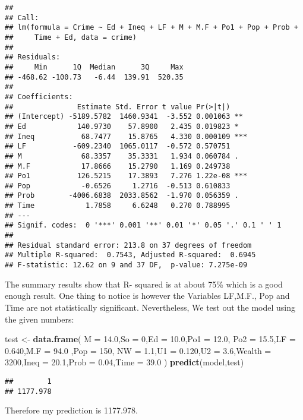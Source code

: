 \documentclass[
]{article}
\newenvironment{Shaded}{\begin{snugshade}}{\end{snugshade}}
\newcommand{\DataTypeTok}[1]{\textcolor[rgb]{0.13,0.29,0.53}{#1}}
\newcommand{\DecValTok}[1]{\textcolor[rgb]{0.00,0.00,0.81}{#1}}
\newcommand{\FloatTok}[1]{\textcolor[rgb]{0.00,0.00,0.81}{#1}}
\newcommand{\KeywordTok}[1]{\textcolor[rgb]{0.13,0.29,0.53}{\textbf{#1}}}
\newcommand{\NormalTok}[1]{#1}
\newcommand{\StringTok}[1]{\textcolor[rgb]{0.31,0.60,0.02}{#1}}
\begin{document}
\begin{verbatim}
## 
## Call:
## lm(formula = Crime ~ Ed + Ineq + LF + M + M.F + Po1 + Pop + Prob + 
##     Time + Ed, data = crime)
## 
## Residuals:
##     Min      1Q  Median      3Q     Max 
## -468.62 -100.73   -6.44  139.91  520.35 
## 
## Coefficients:
##               Estimate Std. Error t value Pr(>|t|)    
## (Intercept) -5189.5782  1460.9341  -3.552 0.001063 ** 
## Ed            140.9730    57.8900   2.435 0.019823 *  
## Ineq           68.7477    15.8765   4.330 0.000109 ***
## LF           -609.2340  1065.0117  -0.572 0.570751    
## M              68.3357    35.3331   1.934 0.060784 .  
## M.F            17.8666    15.2790   1.169 0.249738    
## Po1           126.5215    17.3893   7.276 1.22e-08 ***
## Pop            -0.6526     1.2716  -0.513 0.610833    
## Prob        -4006.6838  2033.8562  -1.970 0.056359 .  
## Time            1.7858     6.6248   0.270 0.788995    
## ---
## Signif. codes:  0 '***' 0.001 '**' 0.01 '*' 0.05 '.' 0.1 ' ' 1
## 
## Residual standard error: 213.8 on 37 degrees of freedom
## Multiple R-squared:  0.7543, Adjusted R-squared:  0.6945 
## F-statistic: 12.62 on 9 and 37 DF,  p-value: 7.275e-09
\end{verbatim}

The summary results show that R- squared is at about 75\% which is a
good enough result. One thing to notice is however the Variables
LF,M.F., Pop and Time are not statistically significant. Nevertheless,
We test out the model using the given numbers:

\begin{Shaded}
\begin{Highlighting}[]
\NormalTok{test <-}\StringTok{ }\KeywordTok{data.frame}\NormalTok{(   }\DataTypeTok{M =} \FloatTok{14.0}\NormalTok{,}\DataTypeTok{So =} \DecValTok{0}\NormalTok{,}\DataTypeTok{Ed =} \FloatTok{10.0}\NormalTok{,}\DataTypeTok{Po1 =} \FloatTok{12.0}\NormalTok{,}
                      \DataTypeTok{Po2 =} \FloatTok{15.5}\NormalTok{,}\DataTypeTok{LF =} \FloatTok{0.640}\NormalTok{,}\DataTypeTok{M.F =} \FloatTok{94.0}\NormalTok{ ,}\DataTypeTok{Pop =} \DecValTok{150}\NormalTok{,}
                      \DataTypeTok{NW =} \FloatTok{1.1}\NormalTok{,}\DataTypeTok{U1 =} \FloatTok{0.120}\NormalTok{,}\DataTypeTok{U2 =} \FloatTok{3.6}\NormalTok{,}\DataTypeTok{Wealth =} \DecValTok{3200}\NormalTok{,}\DataTypeTok{Ineq =} \FloatTok{20.1}\NormalTok{,}\DataTypeTok{Prob =} \FloatTok{0.04}\NormalTok{,}\DataTypeTok{Time =} \FloatTok{39.0}
\NormalTok{                      )}
\KeywordTok{predict}\NormalTok{(model,test)}
\end{Highlighting}
\end{Shaded}

\begin{verbatim}
##        1 
## 1177.978
\end{verbatim}

Therefore my prediction is 1177.978.
\end{document}
